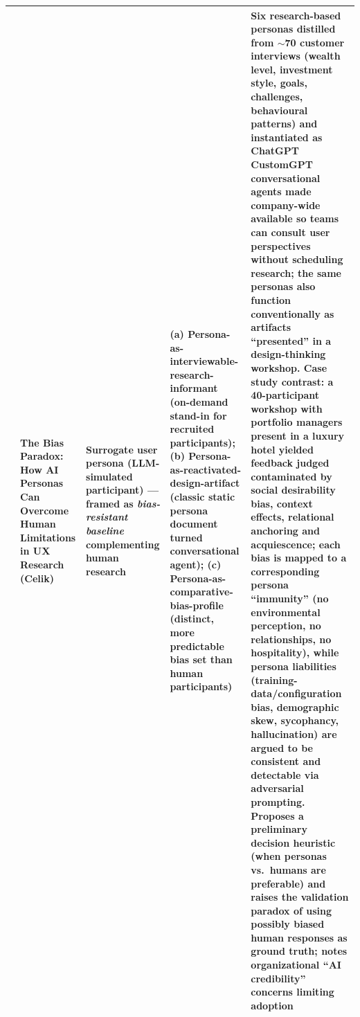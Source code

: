 \begin{table}[t]
\begin{tabular}{p{0.5cm} p{3.6cm} p{3.4cm} p{3.6cm} p{3.6cm}}
\addlinespace
9 & The Bias Paradox: How AI Personas Can Overcome Human Limitations in UX Research (Celik) &
Surrogate user persona (LLM-simulated participant) --- framed as \emph{bias-resistant baseline} complementing human research &
(a) Persona-as-interviewable-research-informant (on-demand stand-in for recruited participants); (b) Persona-as-reactivated-design-artifact (classic static persona document turned conversational agent); (c) Persona-as-comparative-bias-profile (distinct, more predictable bias set than human participants) &
Six research-based personas distilled from $\sim$70 customer interviews (wealth level, investment style, goals, challenges, behavioural patterns) and instantiated as ChatGPT CustomGPT conversational agents made company-wide available so teams can consult user perspectives without scheduling research; the same personas also function conventionally as artifacts ``presented'' in a design-thinking workshop. Case study contrast: a 40-participant workshop with portfolio managers present in a luxury hotel yielded feedback judged contaminated by social desirability bias, context effects, relational anchoring and acquiescence; each bias is mapped to a corresponding persona ``immunity'' (no environmental perception, no relationships, no hospitality), while persona liabilities (training-data/configuration bias, demographic skew, sycophancy, hallucination) are argued to be consistent and detectable via adversarial prompting. Proposes a preliminary decision heuristic (when personas vs.\ humans are preferable) and raises the validation paradox of using possibly biased human responses as ground truth; notes organizational ``AI credibility'' concerns limiting adoption \\
\bottomrule
\end{tabular}
\end{table}
